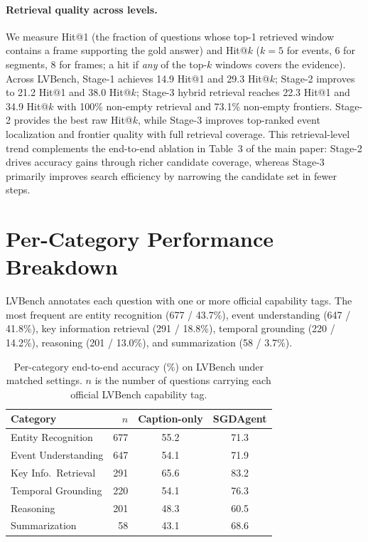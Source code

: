 \documentclass[sigconf, screen, review, anonymous]{acmart}
\begin{document}
\paragraph{Retrieval quality across levels.}
We measure Hit@1 (the fraction of questions whose top-1 retrieved window contains a frame supporting the gold answer) and Hit@$k$ ($k{=}5$ for events, $6$ for segments, $8$ for frames; a hit if \emph{any} of the top-$k$ windows covers the evidence).
Across LVBench\cite{lvbench}, Stage-1 achieves 14.9 Hit@1 and 29.3 Hit@$k$; Stage-2 improves to 21.2 Hit@1 and 38.0 Hit@$k$; Stage-3 hybrid retrieval reaches 22.3 Hit@1 and 34.9 Hit@$k$ with 100\% non-empty retrieval and 73.1\% non-empty frontiers. Stage-2 provides the best raw Hit@$k$, while Stage-3 improves top-ranked event localization and frontier quality with full retrieval coverage. This retrieval-level trend complements the end-to-end ablation in Table~3 of the main paper: Stage-2 drives accuracy gains through richer candidate coverage, whereas Stage-3 primarily improves search efficiency by narrowing the candidate set in fewer steps.

\section{Per-Category Performance Breakdown}
\label{sec:category}

LVBench\cite{lvbench} annotates each question with one or more official capability tags. The most frequent are entity recognition (677 / 43.7\%), event understanding (647 / 41.8\%), key information retrieval (291 / 18.8\%), temporal grounding (220 / 14.2\%), reasoning (201 / 13.0\%), and summarization (58 / 3.7\%).

\begin{table}[t]
\caption{Per-category end-to-end accuracy (\%) on LVBench\cite{lvbench} under matched settings. $n$ is the number of questions carrying each official LVBench capability tag.}
\label{tab:per-category}
\centering
\small
\begin{tabular}{lrcc}
\toprule
Category & $n$ & Caption-only & SGDAgent \\
\midrule
Entity Recognition & 677 & 55.2 & 71.3 \\
Event Understanding & 647 & 54.1 & 71.9 \\
Key Info.\ Retrieval & 291 & 65.6 & 83.2 \\
Temporal Grounding & 220 & 54.1 & 76.3 \\
Reasoning & 201 & 48.3 & 60.5 \\
Summarization & 58 & 43.1 & 68.6 \\
\bottomrule
\end{tabular}
\end{table}
\end{document}
